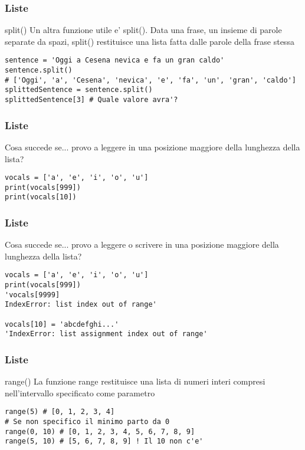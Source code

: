 \begin{frame}[fragile]
\frametitle{Liste}
    \begin{block}{split()}
Un altra funzione utile e' split().
Data una frase, un insieme di parole separate da spazi, split() restituisce una lista fatta dalle parole della frase stessa
    \end{block}
    
    \begin{lstlisting}
sentence = 'Oggi a Cesena nevica e fa un gran caldo'
sentence.split()
# ['Oggi', 'a', 'Cesena', 'nevica', 'e', 'fa', 'un', 'gran', 'caldo']
splittedSentence = sentence.split()
splittedSentence[3] # Quale valore avra'?
    \end{lstlisting}

\end{frame}

\begin{frame}[fragile]
\frametitle{Liste}
    \begin{block}{Cosa succede se...}
provo a leggere in una posizione maggiore della lunghezza della lista?
    \end{block}
    
    \begin{lstlisting}
vocals = ['a', 'e', 'i', 'o', 'u']
print(vocals[999])
print(vocals[10])
    \end{lstlisting}

\end{frame}

\begin{frame}[fragile]
\frametitle{Liste}
    \begin{block}{Cosa succede se...}
provo a leggere o scrivere in una posizione maggiore della lunghezza della lista?
    \end{block}
    
    \begin{lstlisting}
vocals = ['a', 'e', 'i', 'o', 'u']
print(vocals[999])
'vocals[9999]
IndexError: list index out of range'

vocals[10] = 'abcdefghi...'
'IndexError: list assignment index out of range'
    \end{lstlisting}
\end{frame}

\begin{frame}[fragile]
\frametitle{Liste}
    \begin{block}{range()}
    La funzione range restituisce una lista di numeri interi compresi nell'intervallo specificato come parametro
    \end{block}
    
    \begin{lstlisting}
range(5) # [0, 1, 2, 3, 4]
# Se non specifico il minimo parto da 0    
range(0, 10) # [0, 1, 2, 3, 4, 5, 6, 7, 8, 9]
range(5, 10) # [5, 6, 7, 8, 9] ! Il 10 non c'e'
    \end{lstlisting}
\end{frame}

